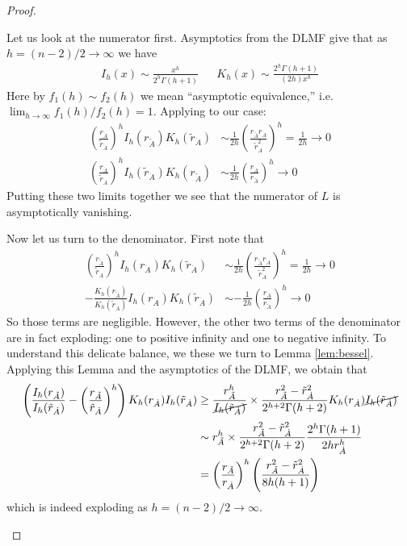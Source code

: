 \documentclass[12pt, nofootinbib,english, amsmath, amssymb, aps, priprint, graphicx,floatfix]{revtex4-1}
\theoremstyle{plain}
\theoremstyle{definition}
\theoremstyle{plain}
\begin{document}
\begin{proof}
\begin{itemize}
    Let us look at the numerator first.  Asymptotics from the DLMF give that as $h=(n-2)/2 \rightarrow \infty$ we have
    \begin{align*}
    I_h(x) \sim \frac{x^h}{2^h\Gamma(h+1)} & & K_h(x) \sim \frac{2^h\Gamma(h+1)}{(2h)x^h}  
    \end{align*}
    Here by $f_1(h)\sim f_2(h)$ we mean ``asymptotic equivalence,'' i.e.\ $\lim_{h\rightarrow\infty}f_1(h)/f_2(h)=1$. Applying to our case:
    \begin{align*}
        \left(\frac{r_{\dot A}}{\tilde r_{\dot A}}\right)^h I_h (r_{\tilde{A}}) K_h ( \tilde r_{\dot A}) &
	\sim \frac{1}{2h}\left(\frac{r_{\tilde{A}} r_{\dot A}}{\tilde r_{\dot A}^2}\right)^h = \frac{1}{2h} \rightarrow 0 \\
        \left(\frac{r_{\dot A}}{\tilde r_{\dot A}}\right)^h I_h ( \tilde r_{\dot A}) K_h (r_{\tilde{A}}) &
	\sim \frac{1}{2h}\left(\frac{ r_{\dot A}}{r_{\tilde A}}\right)^h \rightarrow 0
    \end{align*}
    Putting these two limits together we see that the numerator of $L$ is asymptotically vanishing.

    Now let us turn to the denominator.  First note that 
    \begin{align*}
     \left( \frac{r_{\tilde{A}}}{\tilde r_{\dot A}}\right)^h  
	    I_h (r_{\dot A})K_h ( \tilde r_{\dot A}) &\sim \frac{1}{2h}\left(\frac{r_{\tilde{A}} r_{\dot A}}{\tilde r_{\dot A}^2}\right)^h = \frac{1}{2h} \rightarrow 0\\
     - \frac{K_h ( r_{\tilde{A}})}{K_h ( \tilde r_{\dot A})} 
	    I_h (r_{\dot A})K_h ( \tilde r_{\dot A}) &\sim -\frac{1}{2h}\left(\frac{r_{\dot A}}{r_{\tilde A}}\right)^h \rightarrow 0
    \end{align*}
    So those terms are negligible.  However, the other two terms of the denominator are in fact exploding: one to positive infinity and one to negative infinity.  To understand this delicate balance, we these we turn to Lemma \ref{lem:bessel}.  Applying this Lemma and the asymptotics of the DLMF, we obtain that
    \begin{align*}
    \left( \frac{I_h ( r_{\tilde{A}})}{I_h ( \tilde r_{\dot A})} - \left(\frac{r_{\tilde{A}}}{\tilde r_{\dot A}} \right)^h  \right)
                K_h ( r_{\dot A}) I_h ( \tilde r_{\dot A}) 
        &\geq \frac{r_{\tilde{A}}^h}{\cancel{I_h(\tilde r_{\dot A})}}\times\frac{r_{\tilde{A}}^{2} -\tilde r_{\dot A}^{2}}{2^{h+2}\Gamma(h+2)} K_h ( r_{\dot A}) \cancel{I_h ( \tilde r_{\dot A})} \\
        &\sim r_{\tilde{A}}^h\times\frac{r_{\tilde{A}}^{2} -\tilde r_{\dot A}^{2}}{2^{h+2}\Gamma(h+2)} \frac{2^h \Gamma(h+1)}{2hr_{\dot A}^h}  \\
        &=\left(\frac{r_{\tilde{A}}}{r_{\dot A}} \right)^h \left(\frac{r_{\tilde A}^2 - \tilde r_{\dot A}^2}{8h(h+1)}\right)
    \end{align*}
    which is indeed exploding as $h=(n-2)/2 \rightarrow \infty$.  


\end{itemize}
\end{proof}
\end{document}
